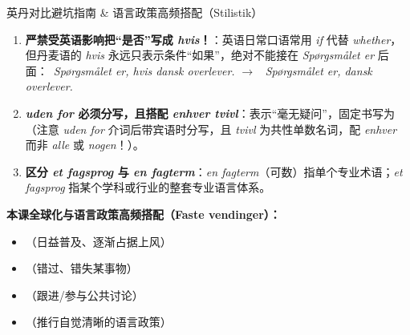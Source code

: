 \begin{grammatikbox}{英丹对比避坑指南 \& 语言政策高频搭配（Stilistik）}
\begin{enumerate}
  \item \textbf{严禁受英语影响把“是否”写成 \textit{hvis}！}：英语日常口语常用 \textit{if} 代替 \textit{whether}，但丹麦语的 \textit{hvis} 永远只表示条件“如果”，绝对不能接在 \textit{Spørgsmålet er} 后面：\ \textit{Spørgsmålet er, hvis dansk overlever.} $\rightarrow$ \ \textit{Spørgsmålet er,  dansk overlever.}
  \item \textbf{\textit{uden for} 必须分写，且搭配 \textit{enhver tvivl}}：表示“毫无疑问”，固定书写为 （注意 \textit{uden for} 介词后带宾语时分写，且 \textit{tvivl} 为共性单数名词，配 \textit{enhver} 而非 \textit{alle} 或 \textit{nogen}！）。
  \item \textbf{区分 \textit{et fagsprog} 与 \textit{en fagterm}}：\textit{en fagterm}（可数）指单个专业术语；\textit{et fagsprog} 指某个学科或行业的整套专业语言体系。
\end{enumerate}

\textbf{本课全球化与语言政策高频搭配（Faste vendinger）：}
\begin{itemize}
  \item {}（日益普及、逐渐占据上风）
  \item {}（错过、错失某事物）
  \item {}（跟进/参与公共讨论）
  \item {}（推行自觉清晰的语言政策）
\end{itemize}
\end{grammatikbox}



